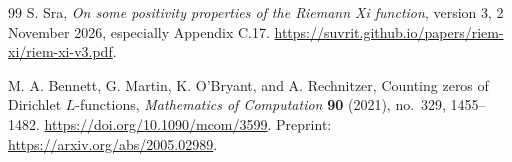 \begin{thebibliography}{99}
S. Sra, \emph{On some positivity properties of the Riemann Xi
function}, version 3, 2 November 2026, especially Appendix C.17.
\url{https://suvrit.github.io/papers/riem-xi/riem-xi-v3.pdf}.

M. A. Bennett, G. Martin, K. O'Bryant, and A. Rechnitzer,
Counting zeros of Dirichlet $L$-functions,
\emph{Mathematics of Computation} \textbf{90} (2021), no.~329,
1455--1482.
\url{https://doi.org/10.1090/mcom/3599}.
Preprint: \url{https://arxiv.org/abs/2005.02989}.

\end{thebibliography}
